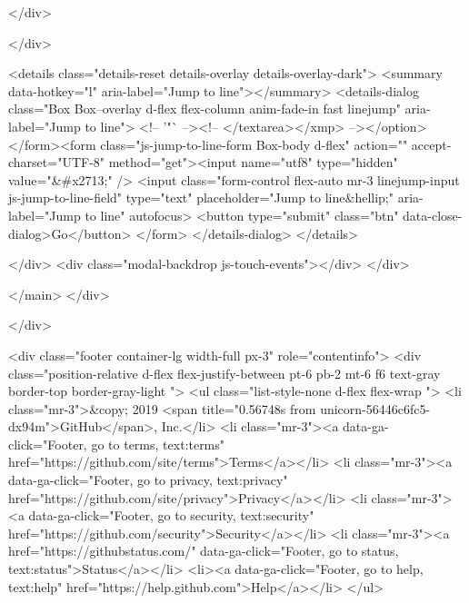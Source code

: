   </div>

    </div>

  

  <details class="details-reset details-overlay details-overlay-dark">
    <summary data-hotkey="l" aria-label="Jump to line"></summary>
    <details-dialog class="Box Box--overlay d-flex flex-column anim-fade-in fast linejump" aria-label="Jump to line">
      <!-- '"` --><!-- </textarea></xmp> --></option></form><form class="js-jump-to-line-form Box-body d-flex" action="" accept-charset="UTF-8" method="get"><input name="utf8" type="hidden" value="&#x2713;" />
        <input class="form-control flex-auto mr-3 linejump-input js-jump-to-line-field" type="text" placeholder="Jump to line&hellip;" aria-label="Jump to line" autofocus>
        <button type="submit" class="btn" data-close-dialog>Go</button>
</form>    </details-dialog>
  </details>



  </div>
  <div class="modal-backdrop js-touch-events"></div>
</div>

    </main>
  </div>
  

  </div>

        
<div class="footer container-lg width-full px-3" role="contentinfo">
  <div class="position-relative d-flex flex-justify-between pt-6 pb-2 mt-6 f6 text-gray border-top border-gray-light ">
    <ul class="list-style-none d-flex flex-wrap ">
      <li class="mr-3">&copy; 2019 <span title="0.56748s from unicorn-56446c6fc5-dx94m">GitHub</span>, Inc.</li>
        <li class="mr-3"><a data-ga-click="Footer, go to terms, text:terms" href="https://github.com/site/terms">Terms</a></li>
        <li class="mr-3"><a data-ga-click="Footer, go to privacy, text:privacy" href="https://github.com/site/privacy">Privacy</a></li>
        <li class="mr-3"><a data-ga-click="Footer, go to security, text:security" href="https://github.com/security">Security</a></li>
        <li class="mr-3"><a href="https://githubstatus.com/" data-ga-click="Footer, go to status, text:status">Status</a></li>
        <li><a data-ga-click="Footer, go to help, text:help" href="https://help.github.com">Help</a></li>
    </ul>

